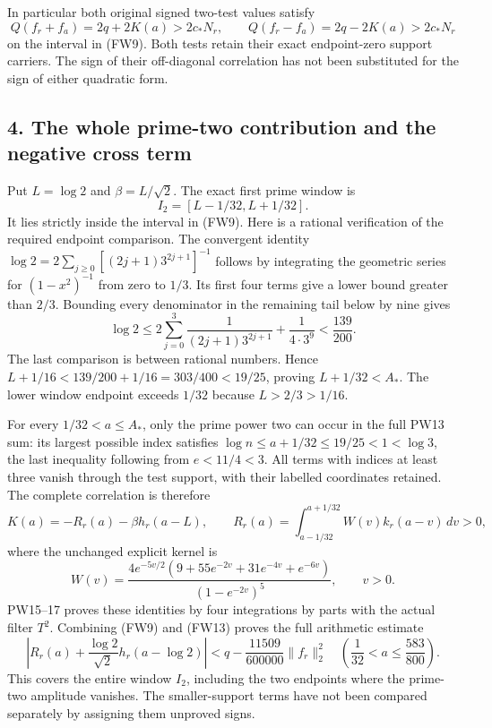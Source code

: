 \documentclass[
  10pt,
  a4paper,
]{article}
\begin{document}
In particular both original signed two-test values satisfy \[
Q(f_r+f_a)=2q+2K(a)>2c_*N_r,\qquad
Q(f_r-f_a)=2q-2K(a)>2c_*N_r
\tag{FW10}
\] on the interval in (FW9). Both tests retain their exact endpoint-zero
support carriers. The sign of their off-diagonal correlation has not
been substituted for the sign of either quadratic form.

\subsection{4. The whole prime-two contribution and the negative cross
term}\label{the-whole-prime-two-contribution-and-the-negative-cross-term}

Put \(L=\log2\) and \(\beta=L/\sqrt2\). The exact first prime window is
\[
I_2=[L-1/32,L+1/32].
\tag{FW11}
\] It lies strictly inside the interval in (FW9). Here is a rational
verification of the required endpoint comparison. The convergent
identity \(\log2=2\sum_{j\ge0}[(2j+1)3^{2j+1}]^{-1}\) follows by
integrating the geometric series for \((1-x^2)^{-1}\) from zero to
\(1/3\). Its first four terms give a lower bound greater than \(2/3\).
Bounding every denominator in the remaining tail below by nine gives \[
\log2\le
2\sum_{j=0}^{3}\frac1{(2j+1)3^{2j+1}}
+\frac1{4\cdot3^9}
<\frac{139}{200}.
\tag{FW12}
\] The last comparison is between rational numbers. Hence
\(L+1/16<139/200+1/16=303/400<19/25\), proving \(L+1/32<A_*\). The lower
window endpoint exceeds \(1/32\) because \(L>2/3>1/16\).

For every \(1/32<a\le A_*\), only the prime power two can occur in the
full PW13 sum: its largest possible index satisfies
\(\log n\le a+1/32\le19/25<1<\log3\), the last inequality following from
\(e<11/4<3\). All terms with indices at least three vanish through the
test support, with their labelled coordinates retained. The complete
correlation is therefore \[
\boxed{K(a)=-R_r(a)-\beta h_r(a-L),}
\qquad
R_r(a)=\int_{a-1/32}^{a+1/32}W(v)k_r(a-v)\,dv>0,
\tag{FW13}
\] where the unchanged explicit kernel is \[
W(v)=\frac{4e^{-5v/2}(9+55e^{-2v}+31e^{-4v}+e^{-6v})}
{(1-e^{-2v})^5},\qquad v>0.
\tag{FW14}
\] PW15--17 proves these identities by four integrations by parts with
the actual filter \(T^2\). Combining (FW9) and (FW13) proves the full
arithmetic estimate \[
\boxed{\left|R_r(a)+\frac{\log2}{\sqrt2}h_r(a-\log2)\right|
<q-\frac{11509}{600000}\|f_r\|_2^2
\quad\left(\frac1{32}<a\le\frac{583}{800}\right).}
\tag{FW15}
\] This covers the entire window \(I_2\), including the two endpoints
where the prime-two amplitude vanishes. The smaller-support terms have
not been compared separately by assigning them unproved signs.
\end{document}

